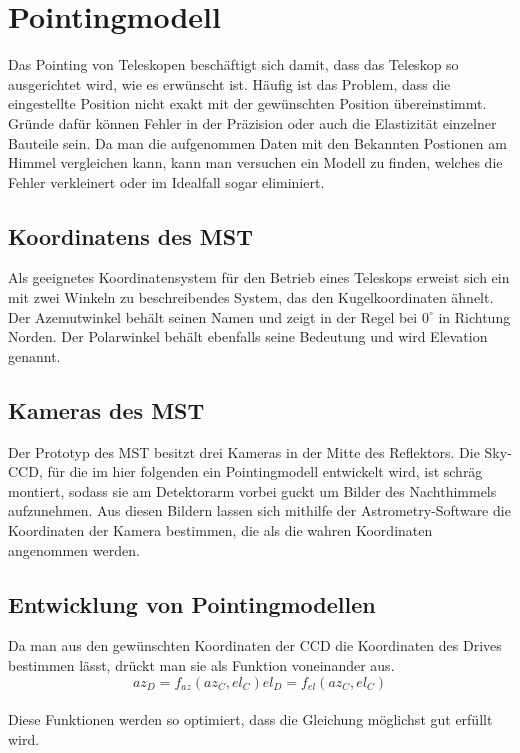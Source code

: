 \chapter{Pointingmodell}
Das Pointing von Teleskopen beschäftigt sich damit, dass das Teleskop so ausgerichtet wird, wie es erwünscht ist. Häufig ist das Problem, dass die eingestellte Position nicht exakt mit der gewünschten Position übereinstimmt. Gründe dafür können Fehler in der Präzision oder auch die Elastizität einzelner Bauteile sein. Da man die aufgenommen Daten mit den Bekannten Postionen am Himmel vergleichen kann, kann man versuchen ein Modell zu finden, welches die Fehler verkleinert oder im Idealfall sogar eliminiert.

\section{Koordinatens des MST}
Als geeignetes Koordinatensystem für den Betrieb eines Teleskops erweist sich ein mit zwei Winkeln zu beschreibendes System, das den Kugelkoordinaten ähnelt. Der Azemutwinkel behält seinen Namen und zeigt in der Regel bei $0^\circ$ in Richtung Norden. Der Polarwinkel behält ebenfalls seine Bedeutung und wird Elevation genannt.

\section{Kameras des MST}
Der Prototyp des MST besitzt drei Kameras in der Mitte des Reflektors. Die Sky-CCD, für die im hier folgenden ein Pointingmodell entwickelt wird, ist schräg montiert, sodass sie am Detektorarm vorbei guckt um Bilder des Nachthimmels aufzunehmen. Aus diesen Bildern lassen sich mithilfe der Astrometry-Software die Koordinaten der Kamera bestimmen, die als die wahren Koordinaten angenommen werden.

\section{Entwicklung von Pointingmodellen}
Da man aus den gewünschten Koordinaten der CCD die Koordinaten des Drives bestimmen lässt, drückt man sie als Funktion voneinander aus.
\begin{equation}
az_D=f_{az}(az_C,el_C)
el_D=f_{el}(az_C,el_C)
\label{eq:pointingprinciple}
\end{equation}\\

Diese Funktionen werden so optimiert, dass die Gleichung möglichst gut erfüllt wird.

